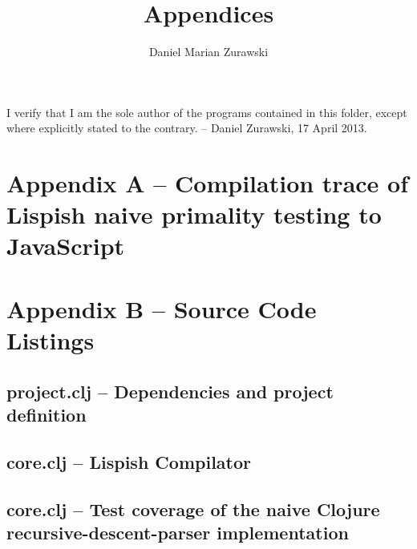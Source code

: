 \documentclass{article}
\title{Appendices}
\author{Daniel Marian Zurawski}
\begin{document}
\maketitle
\scriptsize

I verify that I am the sole author of the programs contained in this folder, except where explicitly stated to the contrary. – Daniel Zurawski, 17 April 2013.

\section{Appendix A -- Compilation trace of Lispish naive primality testing to JavaScript}


\section{Appendix B -- Source Code Listings}

\subsection{project.clj -- Dependencies and project definition}


\subsection{core.clj -- Lispish Compilator}


\subsection{core.clj -- Test coverage of the naive Clojure recursive-descent-parser implementation}

\end{document}
